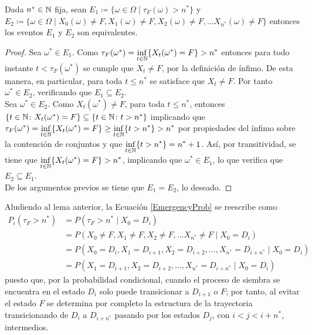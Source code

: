 \begin{lemma}[]
	Dada $n^* \in\mathbb{N}$ fija, sean $E_1\coloneq \{\omega\in \Omega \mid \tau_{F} (\omega) >n^*\}$ y $E_2\coloneq \{\omega\in \Omega \mid X_0(\omega) \neq F, X_1(\omega) \neq F, X_2(\omega) \neq F, \ldots X_{n^*}(\omega) \neq F\}$ entonces los eventos $E_1$ y $E_2$ son equivalentes.
\end{lemma}

 \begin{proof}
 	Sea $\omega^*\in E_1$. Como $\tau_{F} (\omega^*)= \displaystyle \inf_{t\in \mathbb{N}}\{X_{t}(\omega^*)=F\} > n^*$  entonces para todo instante $t<\tau_{F} (\omega^*)$ se cumple que $X_{t}\neq F$, por la definición de ínfimo. De esta manera, en particular, para toda $t\leq n^*$ se satisface que $X_{t}\neq F$. Por tanto $\omega^* \in E_2$, verificando que $E_1\subseteq E_2.$\\

	Sea $\omega^*\in E_2$. Como $X_{t}(\omega^*)\neq F$, para toda $t\leq n^*$, entonces $\{t\in\mathbb{N}\colon X_t(\omega^*)=F\}\subseteq \{t\in\mathbb{N}\colon t>n^*\}$ implicando que $\displaystyle \tau_{F} (\omega^*) = \inf_{t\in \mathbb{N}}\{X_{t}(\omega^*)=F\} \geq  \inf_{t\in \mathbb{N}}\{t>n^*\} > n^*$ por propiedades del ínfimo sobre la contención de conjuntos y que $\displaystyle \inf_{t\in \mathbb{N}}\{t>n^*\} =n^*+1$. Así, por transitividad, se tiene que $\displaystyle \inf_{t\in \mathbb{N}}\{X_{t}(\omega^*)=F\} > n^*$, implicando que $\omega^*\in E_1$, lo que verifica que $E_2\subseteq E_1$.\\
	
	De los argumentos previos se tiene que $E_1=E_2$, lo deseado.
 \end{proof}

Aludiendo al lema anterior, la Ecuación \eqref{EmergencyProb} se reescribe como \begin{equation}
	\begin{aligned}
		P_{i}(	\tau_{F} > n^* ) 
		&=	P(	\tau_{F} > n^* \mid X_{0}=D_i ) \\
		&=P( X_0 \neq F, X_1 \neq F, X_2 \neq F, \ldots X_{n^*} \neq F \mid X_{0}=D_i )\\
		&=P( X_0 = D_i, X_1 = D_{i+1}, X_2 =D_{i+2}, \ldots, X_{n^*}= D_{i+n^*} \mid X_{0}=D_i )\\
		&=P( X_1 = D_{i+1}, X_2 =D_{i+2}, \ldots, X_{n^*} =D_{i+n^*} \mid X_{0}=D_i )
	\end{aligned}
\end{equation}puesto que, por la probabilidad condicional, cuando el proceso de siembra se encuentra en el estado $D_i$ solo puede transicionar a $D_{i+1}$ o $F$; por tanto, al evitar el estado $F$ se determina por completo la estructura de la trayectoria transicionando de $D_{i}$ a $D_{i+n^*}$ pasando por los estados $D_{j}$, con $i<j<{i+n^*}$, intermedios.\\

